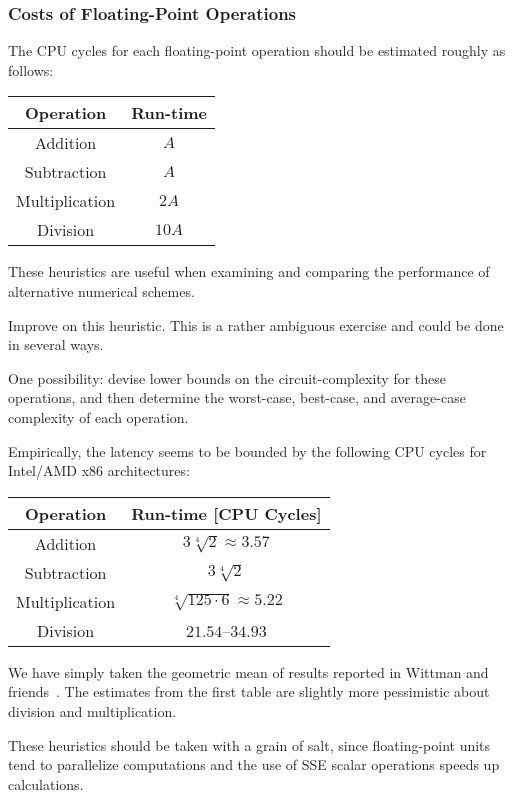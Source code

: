 \subsubsection{Costs of Floating-Point Operations}
\begin{heuristic}
  The CPU cycles for each floating-point operation should be estimated
  roughly as follows:
  \begin{center}
    \bgroup
    \def\arraystretch{1.125}
  \begin{tabular}{c|c}
    Operation & Run-time\\\hline
    Addition & $A$ \\
    Subtraction & $A$ \\
    Multiplication & $2A$ \\
    Division & $10A$
  \end{tabular}
  \egroup
  \end{center}
  These heuristics are useful when examining and comparing the
  performance of alternative numerical schemes.
\end{heuristic}
\begin{xca}
  Improve on this heuristic. This is a rather ambiguous exercise and
  could be done in several ways.

  One possibility: devise lower bounds on the circuit-complexity for
  these operations, and then determine the worst-case, best-case, and
  average-case complexity of each operation.
\end{xca}
\begin{ex}[x86-64 Estimates]
  Empirically, the latency seems to be bounded by the following CPU
  cycles for Intel/AMD x86 architectures:
  \begin{center}
  \bgroup
  \def\arraystretch{1.125}
  \begin{tabular}{c|c}
    Operation & Run-time [CPU Cycles]\\\hline
    Addition & $3 \sqrt[4]{2}\approx 3.57$ \\
    Subtraction &  $3\sqrt[4]{2}$ \\
    Multiplication & $\sqrt[4]{125\cdot 6}\approx5.22$ \\
    Division & $21.54$--$34.93$
  \end{tabular}
  \egroup
  \end{center}
  We have simply taken the geometric mean of results reported in Wittman
  and friends~\cite{DBLP:journals/corr/WittmannZHW15}. The estimates
  from the first table are slightly more pessimistic about division and
  multiplication.

  These heuristics should be taken with a grain of salt, since
  floating-point units tend to parallelize computations and the use of
  SSE scalar operations speeds up calculations.
\end{ex}
